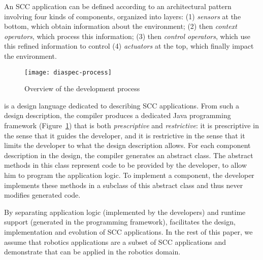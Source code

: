 An SCC application can be defined according to an architectural
pattern involving four kinds of components, organized into layers: (1)
\emph{sensors} at the bottom, which obtain information about the
environment; (2) then \emph{context operators}, which process this
information; (3) then \emph{control operators}, which use this refined
information to control (4) \emph{actuators} at the top, which finally
impact the environment.

\begin{figure}
  \centering
  \texttt{[image: diaspec-process]}
  \caption{Overview of the \diaspec{} development process}
  \label{fig:diaspec-process}
\end{figure}

\diaspec{} is a design language dedicated to describing SCC
applications. From such a design description, the \diaspec{} compiler
produces a dedicated Java programming framework
(Figure~\ref{fig:diaspec-process}) that is both \emph{prescriptive}
and \emph{restrictive}: it is prescriptive in the sense that it guides
the developer, and it is restrictive in the sense that it limits the
developer to what the design description allows. For each component
description in the design, the compiler generates an abstract class.
The abstract methods in this class represent code to be provided by
the developer, to allow him to program the application logic. To
implement a component, the developer implements these methods in a
subclass of this abstract class and thus never modifies generated
code.

By separating application logic (implemented by the developers) and
runtime support (generated in the programming framework), \diaspec{}
facilitates the design, implementation and evolution of SCC
applications. In the rest of this paper, we assume that robotics
applications are a subset of SCC applications and demonstrate that
\diaspec{} can be applied in the robotics domain.

